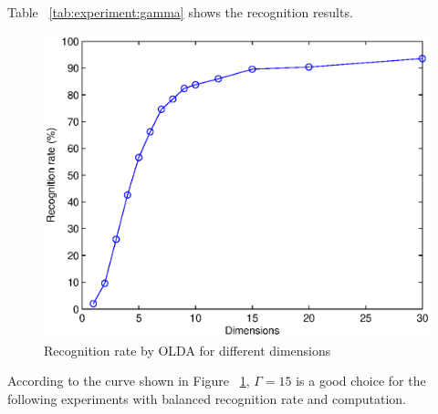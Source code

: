 

Table ~\ref{tab:experiment:gamma} shows the recognition results.

\begin{figure}[htb]
\begin{center}
\includegraphics[width=\linewidth]{ch-experiment/figures/gamma}
\caption[Recognition rate by OLDA for different dimensions]{Recognition rate by OLDA for different dimensions}
\label{fig:experiment:gamma}
\end{center}
\end{figure}

According to the curve shown in Figure ~\ref{fig:experiment:gamma}, $\Gamma=15$ is a good choice for the following experiments with balanced recognition rate and computation.
